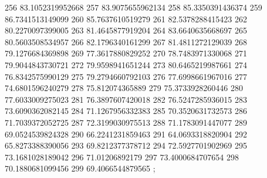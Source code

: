 {256 83.1052319952668
257 83.9075655962134
258 85.3350391436374
259 86.7341513149099
260 85.7637610519279
261 82.5378288415423
262 80.2270097399005
263 81.4645877919204
264 83.6640635668697
265 80.5603508534957
266 82.1796340161299
267 81.4811272129039
268 79.1276684369898
269 77.3617880829252
270 78.7483971330068
271 79.9044843730721
272 79.9598941651244
273 80.6465219987661
274 76.8342575990129
275 79.2794660792103
276 77.6998661967016
277 74.6801596240279
278 75.812074365889
279 75.3733928260446
280 77.6033009275023
281 76.3897607420018
282 76.5247285936015
283 73.6090362082145
284 71.1267956332383
285 70.3520631732573
286 71.7039372052725
287 72.3199030975513
288 71.1783091447077
289 69.0524539824328
290 66.2241231859463
291 64.0693318820904
292 65.8273388390056
293 69.8212377378712
294 72.5927701902969
295 73.1681028189042
296 71.01206892179
297 73.4000684707654
298 70.1880681099456
299 69.4066544879565
};
